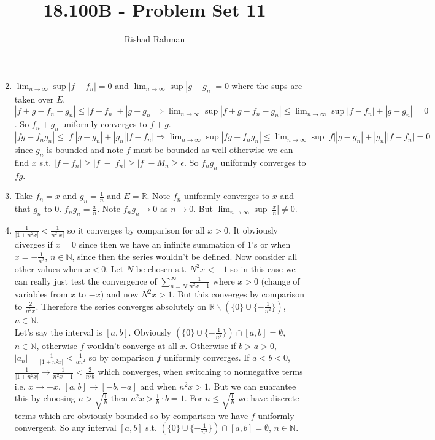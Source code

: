 \documentclass{article}
\begin{document}
\setlength{\abovedisplayskip}{0pt}
\setlength{\belowdisplayskip}{0pt}
\setlength{\abovedisplayshortskip}{0pt}
\setlength{\belowdisplayshortskip}{0pt}
\title{18.100B - Problem Set 11}
\author{Rishad Rahman}
\date{}
\maketitle
\begin{enumerate}
\setcounter{enumi}{1}
\item $\displaystyle\lim_{n\rightarrow\infty} \sup |f-f_n| = 0$ and $\displaystyle\lim_{n\rightarrow\infty} \sup |g-g_n|=0$ where the sups are taken over $E$. $\displaystyle|f+g-f_n-g_n| \leq |f-f_n| + |g-g_n| \Rightarrow \lim_{n\rightarrow\infty}\sup |f+g-f_n-g_n| \leq \lim_{n\rightarrow\infty}\sup |f-f_n| + |g-g_n| = 0$. So ${f_n+g_n}$ uniformly converges to $f+g$.\\
$\displaystyle |fg - f_n g_n|\leq |f||g-g_n| + |g_n||f-f_n|\Rightarrow \lim_{n\rightarrow\infty}\sup |fg - f_n g_n|\leq \lim_{n\rightarrow\infty}\sup |f||g-g_n| + |g_n||f-f_n|=0$ since $g_n$ is bounded and note $f$ must be bounded as well otherwise we can find $x$ s.t. $|f-f_n| \geq |f| - |f_n| \geq |f| - M_n \geq \epsilon$. So $f_n g_n$ uniformly converges to $fg$.\\
\item Take $f_n = x$ and $g_n = \frac{1}{n}$ and $E=\mathbb{R}$. Note $f_n$ uniformly converges to $x$ and that $g_n$ to $0$. $f_n g_n = \frac{x}{n}$. Note $f_n g_n \rightarrow 0$ as $n\rightarrow 0$. But $\displaystyle\lim_{n\rightarrow\infty} \sup \left|\frac{x}{n}\right| \neq 0$. \\
\item $\frac{1}{|1+n^2x|} < \frac{1}{n^2 |x|}$ so it converges by comparison for all $x > 0$. It obviously diverges if $x=0$ since then we have an infinite summation of $1$'s or when $x=-\frac{1}{n^2}$, $n\in \mathbb{N}$, since then the series wouldn't be defined. Now consider all other values when $x<0$. Let $N$ be chosen s.t. $N^2x < -1$ so in this case we can really just test the convergence of $\displaystyle\sum_{n=N}^{\infty} \frac{1}{n^2 x -1}$ where $x>0$ (change of variables from $x$ to $-x$) and now $N^2x > 1$. But this converges by comparison to $\frac{2}{n^2 x}$. Therefore the series converges absolutely on $\mathbb{R}\backslash (\{0\}\cup\{-\frac{1}{n^2}\})$, $n\in\mathbb{N}$.
\\ Let's say the interval is $[a, b]$. Obviously $(\{0\}\cup\{-\frac{1}{n^2}\})\cap [a,b] = \emptyset$, $n\in\mathbb{N}$, otherwise $f$ wouldn't converge at all $x$. Otherwise if $b>a>0$, $|a_n|=\frac{1}{|1+n^2 x|} < \frac{1}{an^2}$ so by comparison $f$ uniformly converges. If $a<b<0$, $\frac{1}{|1+n^2 x|} \rightarrow \frac{1}{n^2x - 1} < \frac{2}{n^2 b}$ which converges, when switching to nonnegative terms i.e. $x \rightarrow-x$, $[a,b]\rightarrow [-b, -a]$ and when $n^2 x >1$. But we can guarantee this by choosing $n > \sqrt{\frac{1}{b}}$ then $n^2 x >\frac{1}{b}\cdot b = 1$. For $n\leq \sqrt{\frac{1}{b}}$ we have discrete terms which are obviously bounded so by comparison we have $f$ uniformly convergent. So any interval $[a,b]$ s.t. $(\{0\}\cup\{-\frac{1}{n^2}\})\cap [a,b] = \emptyset$, $n\in\mathbb{N}$. 

\end{enumerate}
\end{document}
